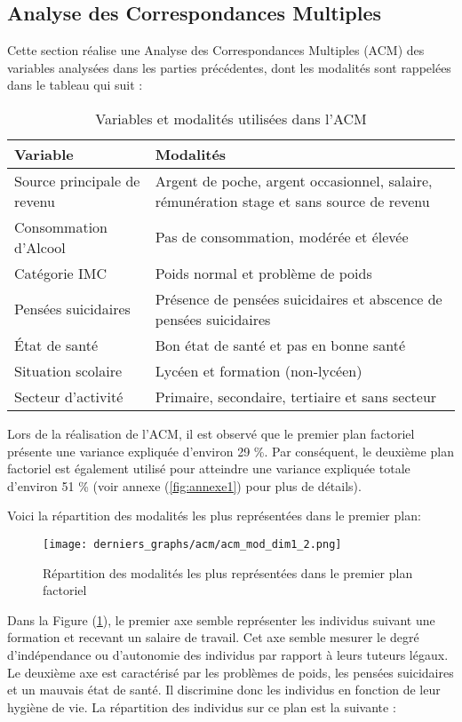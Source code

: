 \documentclass{article}
\begin{document}
\subsection{Analyse des Correspondances Multiples}
Cette section réalise une Analyse des Correspondances Multiples (ACM) des variables analysées dans les parties précédentes, dont les modalités sont rappelées dans le tableau qui suit :
\begin{table}[H]
    \centering
    \begin{tabular}{l|p{10.5cm}}
        \toprule
        \textbf{Variable} & \textbf{Modalités} \\
        \midrule
        Source principale de revenu & Argent de poche, argent occasionnel, salaire, rémunération stage et sans source de revenu \\
        Consommation d’Alcool & Pas de consommation, modérée et élevée \\
        Catégorie IMC &  Poids normal et problème de poids \\
        Pensées suicidaires & Présence de pensées suicidaires et abscence de pensées suicidaires \\
        État de santé & Bon état de santé et pas en bonne santé \\
        Situation scolaire  & Lycéen et formation (non-lycéen)\\
        Secteur d'activité & Primaire, secondaire, tertiaire et sans secteur \\
        
        \bottomrule
    \end{tabular}
    \caption{Variables et modalités utilisées dans l'ACM}
    \label{varACM}
\end{table}

Lors de la réalisation de l'ACM, il est observé que le premier plan factoriel présente une variance expliquée d'environ 29 \%. Par conséquent, le deuxième plan factoriel est également utilisé pour atteindre une variance expliquée totale d'environ 51 \% (voir annexe (\ref{fig:annexe1}) pour plus de détails).

Voici la répartition des modalités les plus représentées dans le premier plan:

\begin{figure}[H]
  \centering
  \texttt{[image: derniers\_graphs/acm/acm\_mod\_dim1\_2.png]} 
  \caption{Répartition des modalités les plus représentées dans le premier plan factoriel}
  \label{fig:acm1}
\end{figure}
Dans la Figure (\ref{fig:acm1}), le premier axe semble représenter les individus suivant une formation et recevant un salaire de travail. Cet axe semble mesurer le degré d'indépendance ou d'autonomie des individus par rapport à leurs tuteurs légaux.  Le deuxième axe est caractérisé par les problèmes de poids, les pensées suicidaires et un mauvais état de santé. Il discrimine donc les individus en fonction de leur hygiène de vie.
La répartition des individus sur ce plan est la suivante :
\end{document}
